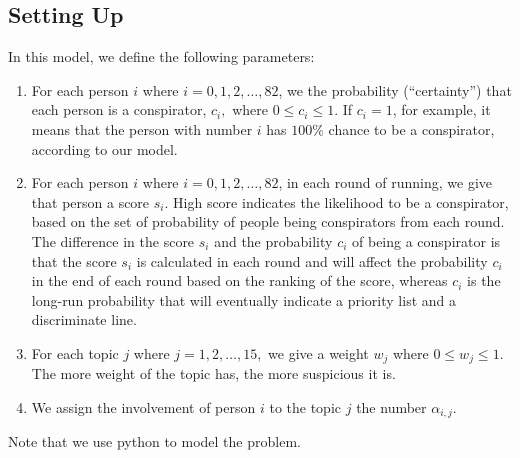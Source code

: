 \documentclass{icmmcm}
\begin{document}
\subsection{Setting Up}
In this model, we define the following parameters:
\begin{enumerate}
\item  For each person $i$ where $i=0,1,2,\ldots, 82$, 
we the probability (``certainty'')
that each person is a conspirator, $c_i,$
where $0\leq c_i \leq 1.$ 
If $c_i=1$, for example, it means that the person
with number $i$ has $100\%$ chance to be
a conspirator, according to our model. 

\item  For each person $i$ where $i=0,1,2,\ldots, 82$, in each round of running,
we give that person a score $s_i$. High score indicates
the likelihood to be a conspirator, based on the set
of probability of people being conspirators from each round.
The difference in the score $s_i$ and the probability $c_i$ of
being a conspirator is that the score $s_i$ is calculated in each round
and will affect the probability $c_i$ in the end of each round
based on the ranking of the score, whereas $c_i$ is the long-run
probability that will eventually indicate a priority list and
a discriminate line.

\item For each topic $j$ where $j=1,2,\ldots,15,$
we give a weight $w_j$ where $0\leq w_j\leq 1.$
The more weight of the topic has, the more suspicious it is.

\item  We assign the involvement of person $i$ to the topic $j$ the number
$\alpha_{i,j}.$
\end{enumerate}

Note that we use python to model the problem.
\end{document}
